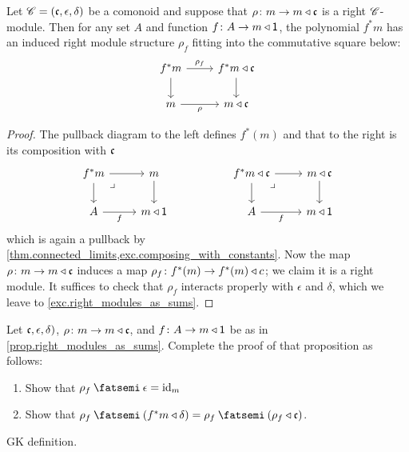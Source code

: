 \documentclass[DynamicalBook]{subfiles}
\begin{document}
\begin{proposition}\label{prop.right_modules_as_sums}
Let $\mathscr{C}=(\mathfrak{c},\epsilon,\delta)$ be a comonoid and suppose that $\rho\colon m\to m\mathbin{\triangleleft}\mathfrak{c}$ is a right $\mathscr{C}$-module. Then for any set $A$ and function $f\colon A\to m\mathbin{\triangleleft}\textsf{1}$, the polynomial $f^*m$ has an induced right module structure $\rho_f$ fitting into the commutative square below:
\[
\begin{tikzcd}
  f^*m\ar[d]\ar[r, "\rho_f"]&
  f^*m\tri\ema{c}\ar[d]\\
  m\ar[r, "\rho"']&
  m\tri\ema{c}
\end{tikzcd}
\]
\end{proposition}
\begin{proof}
The pullback diagram to the left defines $f^*(m)$ and that to the right is its composition with $\mathfrak{c}$
\[
\begin{tikzcd}
	f^*m\ar[r]\ar[d]&
	m\ar[d]\\
	A\ar[r, "f"']&
	m\tri\1\ar[ul, phantom, very near end, "\lrcorner"]
\end{tikzcd}
\hspace{.7in}
\begin{tikzcd}
	f^*m\tri\ema{c}\ar[r]\ar[d]&
	m\tri\ema{c}\ar[d]\\
	A\ar[r, "f"']&
	m\tri\1\ar[ul, phantom, very near end, "\lrcorner"]
\end{tikzcd}
\]
which is again a pullback by \cref{thm.connected_limits,exc.composing_with_constants}. Now the map $\rho\colon m\to m\mathbin{\triangleleft}\mathfrak{c}$ induces a map $\rho_f\colon f^*(m)\to f^*(m)\mathbin{\triangleleft} c$; we claim it is a right module. It suffices to check that $\rho_f$ interacts properly with $\epsilon$ and $\delta$, which we leave to \cref{exc.right_modules_as_sums}.
\end{proof}

\begin{exercise}\label{exc.right_modules_as_sums}
Let $\mathfrak{c},\epsilon,\delta)$, $\rho\colon m\to m\mathbin{\triangleleft}\mathfrak{c}$, and $f\colon A\to m\mathbin{\triangleleft}\textsf{1}$ be as in \cref{prop.right_modules_as_sums}. Complete the proof of that proposition as follows:
\begin{enumerate}
	\item Show that $\rho_f\then\epsilon=\id_m$
	\item Show that $\rho_f\then(f^*m\tri\delta)=\rho_f\then(\rho_f\tri\ema{c})$.
\qedhere
\end{enumerate}
\end{exercise}

\begin{definition}
GK definition.
\end{definition}
\end{document}
